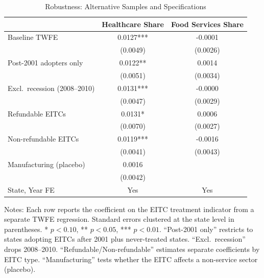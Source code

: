\begin{table}[H]
\centering
\caption{Robustness: Alternative Samples and Specifications}
\label{tab:robustness}
\begin{threeparttable}
\begin{tabular}{lcc}
\toprule
& Healthcare Share & Food Services Share \\
\midrule
Baseline TWFE & 0.0127*** & -0.0001 \\
& (0.0049) & (0.0026) \\[3pt]
Post-2001 adopters only & 0.0122** & 0.0014 \\
& (0.0051) & (0.0034) \\[3pt]
Excl.\ recession (2008--2010) & 0.0131*** & -0.0000 \\
& (0.0047) & (0.0029) \\[3pt]
Refundable EITCs & 0.0131* & 0.0006 \\
& (0.0070) & (0.0027) \\[3pt]
Non-refundable EITCs & 0.0119*** & -0.0016 \\
& (0.0041) & (0.0043) \\[3pt]
Manufacturing (placebo) & 0.0016 & \\
& (0.0042) & \\
\midrule
State, Year FE & Yes & Yes \\
\bottomrule
\end{tabular}
\begin{tablenotes}[flushleft]
\small
\item Notes: Each row reports the coefficient on the EITC treatment indicator from a separate TWFE regression. Standard errors clustered at the state level in parentheses. * $p<0.10$, ** $p<0.05$, *** $p<0.01$. ``Post-2001 only'' restricts to states adopting EITCs after 2001 plus never-treated states. ``Excl.\ recession'' drops 2008--2010. ``Refundable/Non-refundable'' estimates separate coefficients by EITC type. ``Manufacturing'' tests whether the EITC affects a non-service sector (placebo).
\end{tablenotes}
\end{threeparttable}
\end{table}
